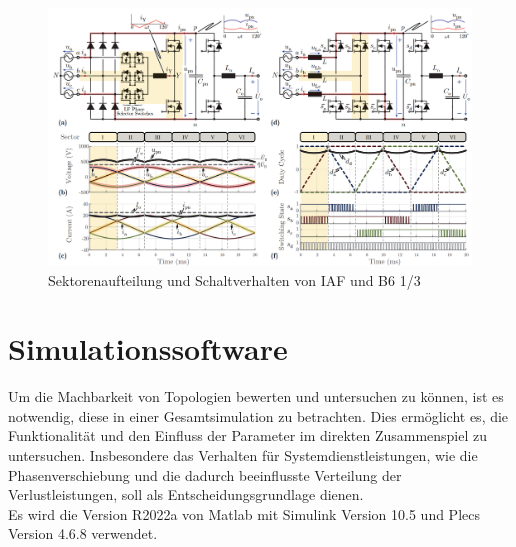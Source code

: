 	\begin{figure}
		\centering
		\includegraphics[width=1\linewidth]{content/Grafiken/B6+IAF_Sectors.png}
		\caption{Sektorenaufteilung und Schaltverhalten von IAF und B6 1/3 \cite{13PWMPFC}}
		\label{fig:b6iafsectors}
	\end{figure}





\section{Simulationssoftware}
	Um die Machbarkeit von Topologien bewerten und untersuchen zu können, ist es notwendig, diese in einer Gesamtsimulation zu betrachten. Dies ermöglicht es, die Funktionalität und den Einfluss der Parameter im direkten Zusammenspiel zu untersuchen. Insbesondere das Verhalten für Systemdienstleistungen, wie die Phasenverschiebung und die dadurch beeinflusste Verteilung der Verlustleistungen, soll als Entscheidungsgrundlage dienen.\\
	Es wird die Version R2022a von Matlab mit Simulink Version 10.5 und Plecs Version 4.6.8 verwendet.  

